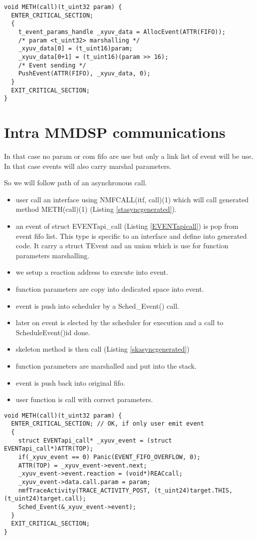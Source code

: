 \begin{lstlisting}[caption=MMDSP call() stub ,label=stmmdspgenerated]
void METH(call)(t_uint32 param) {
  ENTER_CRITICAL_SECTION;
  {
    t_event_params_handle _xyuv_data = AllocEvent(ATTR(FIFO));
    /* param <t_uint32> marshalling */
    _xyuv_data[0] = (t_uint16)param;
    _xyuv_data[0+1] = (t_uint16)(param >> 16);
    /* Event sending */
    PushEvent(ATTR(FIFO), _xyuv_data, 0);
  }
  EXIT_CRITICAL_SECTION;
}
\end{lstlisting}

\section{Intra MMDSP communications}
In that case no param or com fifo are use but only a link list of event will be
use. In that case events will also carry marshal parameters.

So we will follow path of an asynchronous call.
\begin{itemize}
  \item user call an interface using NMFCALL(itf, call)(1) which will call
  generated method METH(call)(1) (Listing \ref{stasyncgenerated}).
  \item an event of struct EVENTapi\_call (Listing \ref{EVENTapicall}) is pop
  from event fifo list. This type is specific to an interface and define into
  generated code. It carry a struct TEvent and an union which is use for
  function parameters marshalling.
  \item we setup a reaction address to execute into event.
  \item function parameters are copy into dedicated space into event.
  \item event is push into scheduler by a Sched\_Event() call.
  \item later on event is elected by the scheduler for execution and a call to
  ScheduleEvent()id done.
  \item skeleton method is then call (Listing \ref{skasyncgenerated})
  \item function parameters are marshalled and put into the stack.
  \item event is push back into original fifo.
  \item user function is call with correct parameters.
\end{itemize}

\begin{lstlisting}[caption=MMDSP call() asynchronous stub
,label=stasyncgenerated]
void METH(call)(t_uint32 param) {
  ENTER_CRITICAL_SECTION; // OK, if only user emit event
  {
    struct EVENTapi_call* _xyuv_event = (struct EVENTapi_call*)ATTR(TOP);
    if(_xyuv_event == 0) Panic(EVENT_FIFO_OVERFLOW, 0);
    ATTR(TOP) = _xyuv_event->event.next;
    _xyuv_event->event.reaction = (void*)REACcall;
    _xyuv_event->data.call.param = param;
    nmfTraceActivity(TRACE_ACTIVITY_POST, (t_uint24)target.THIS, (t_uint24)target.call);
    Sched_Event(&_xyuv_event->event);
  }
  EXIT_CRITICAL_SECTION;
}
\end{lstlisting}

